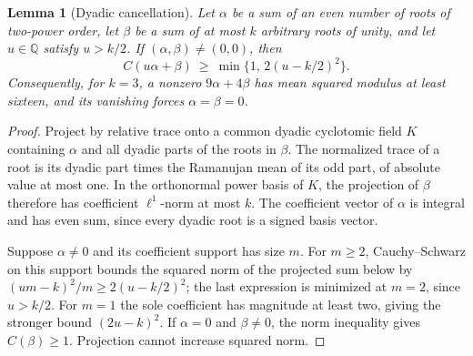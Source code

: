 \documentclass[11pt]{amsart}
\numberwithin{equation}{section}
\newtheorem{lemma}[theorem]{Lemma}
\theoremstyle{definition}
\theoremstyle{plain}
\newcommand{\QQ}{\mathbb Q}
\begin{document}
\begin{lemma}[Dyadic cancellation]\label{r7:coupled-gap}
Let $\alpha$ be a sum of an even number of roots of two-power order,
let $\beta$ be a sum of at most $k$ arbitrary roots of unity, and
let $u\in\QQ$ satisfy $u>k/2$. If $(\alpha,\beta)\ne(0,0)$, then
\[
 C(u\alpha+\beta)\ \ge\
 \min\{1,\,2(u-k/2)^2\}.
\]
Consequently, for $k=3$, a nonzero $9\alpha+4\beta$ has mean
squared modulus at least sixteen, and its vanishing forces
$\alpha=\beta=0$.
\end{lemma}
\begin{proof}
Project by relative trace onto a common dyadic cyclotomic field $K$
containing $\alpha$ and all dyadic parts of the roots in $\beta$.
The normalized trace of a root is its dyadic part times the
Ramanujan mean of its odd part, of absolute value at most one.
In the orthonormal power basis of $K$, the projection of $\beta$
therefore has coefficient $\ell^1$-norm at most $k$. The coefficient
vector of $\alpha$ is integral and has even sum, since every dyadic
root is a signed basis vector.

Suppose $\alpha\ne0$ and its coefficient support has size $m$.
For $m\ge2$, Cauchy--Schwarz on this support bounds the squared
norm of the projected sum below by
$(um-k)^2/m\ge2(u-k/2)^2$; the last expression is minimized at
$m=2$, since $u>k/2$. For $m=1$ the sole coefficient has magnitude
at least two, giving the stronger bound $(2u-k)^2$.
If $\alpha=0$ and $\beta\ne0$, the norm inequality gives
$C(\beta)\ge1$. Projection cannot increase squared norm.
\end{proof}
\end{document}

